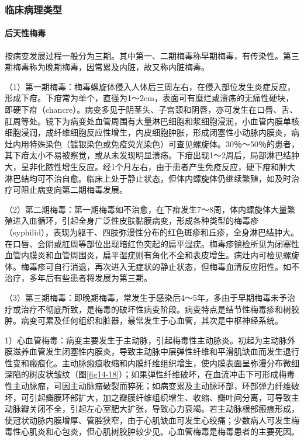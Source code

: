 \subsubsection{临床病理类型}

\paragraph{后天性梅毒}
按病变发展过程一般分为三期。其中第一、二期梅毒称早期梅毒，有传染性。第三期梅毒称为晚期梅毒，因常累及内脏，故又称内脏梅毒。

（1）第一期梅毒：梅毒螺旋体侵入人体后三周左右，在侵入部位发生炎症反应，形成下疳。下疳常为单个，直径为1～2cm，表面可有糜烂或溃疡的无痛性硬块，即硬下疳（chancre）。病变多见于阴茎头、子宫颈和阴唇，亦可发生在口唇、舌、肛周等处。镜下为病变处血管周围有大量淋巴细胞和浆细胞浸润，小血管内膜单核细胞浸润，成纤维细胞反应性增生，内皮细胞肿胀，形成闭塞性小动脉内膜炎，病灶内用特殊染色（镀银染色或免疫荧光染色）可查见螺旋体。30％～50％的患者，其下疳太小不易被察觉，或从未发现明显溃疡。下疳出现1～2周后，局部淋巴结肿大，呈非化脓性增生反应。经1个月左右，由于患者产生免疫反应，硬下疳和肿大淋巴结均可不治自愈。临床上处于静止状态，但体内螺旋体仍继续繁殖，如及时治疗可阻止病变向第二期梅毒发展。

（2）第二期梅毒：第一期梅毒如不治愈，在下疳发生7～8周，体内螺旋体大量繁殖进入血循环，引起全身广泛性皮肤黏膜病变，形成各种类型的梅毒疹（syphilid），表现为躯干、四肢弥漫性分布的红色斑疹和丘疹，全身淋巴结肿大。在口唇、会阴或肛周等部位出现暗红色突起的扁平湿疣。梅毒疹镜检所见为闭塞性血管内膜炎和血管周围炎，扁平湿疣则有角化不全和表皮增生。病灶内可检见螺旋体。梅毒疹可自行消退，再次进入无症状的静止状态，但梅毒血清反应阳性。如不治疗，多年后有些患者将发展为第三期。

（3）第三期梅毒：即晚期梅毒，常发生于感染后4～5年，多由于早期梅毒未予治疗或治疗不彻底所致，是梅毒的破坏性病变阶段。病变特点是结节性梅毒疹和树胶肿。病变可累及任何组织和脏器，最常发生于心血管，其次是中枢神经系统。

1）心血管梅毒：病变主要发生于主动脉，引起梅毒性主动脉炎。初起为主动脉外膜滋养血管发生闭塞性内膜炎，导致主动脉中层弹性纤维和平滑肌缺血而发生退行性变和瘢痕化。主动脉瘢痕收缩和内膜纤维组织增生，使内膜表面呈弥漫分布微细深陷的树皮状皱纹（图\ref{fig14-18}）；如果弹性纤维破坏，在血流冲击下可形成梅毒性主动脉瘤，可因主动脉瘤破裂而猝死；如病变累及主动脉环部，环部弹力纤维破坏，可引起瓣膜环部扩大，加之瓣膜纤维组织增生、收缩、瓣叶间分离，可导致主动脉瓣关闭不全，引起左心室肥大扩张，导致心力衰竭。若主动脉根部瘢痕形成，使冠状动脉内膜增厚、管腔狭窄，由于心肌缺血可发生心绞痛；少数病人可发生梅毒性心肌炎和心包炎，但心肌树胶肿较少见。心血管梅毒是梅毒患者的主要死因。

